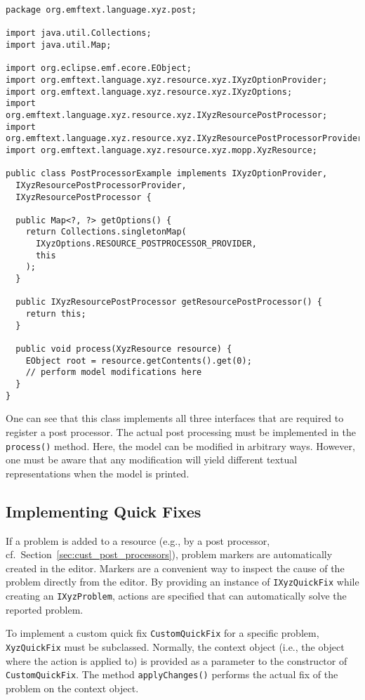 \begin{lstlisting}
package org.emftext.language.xyz.post;

import java.util.Collections;
import java.util.Map;

import org.eclipse.emf.ecore.EObject;
import org.emftext.language.xyz.resource.xyz.IXyzOptionProvider;
import org.emftext.language.xyz.resource.xyz.IXyzOptions;
import org.emftext.language.xyz.resource.xyz.IXyzResourcePostProcessor;
import org.emftext.language.xyz.resource.xyz.IXyzResourcePostProcessorProvider;
import org.emftext.language.xyz.resource.xyz.mopp.XyzResource;

public class PostProcessorExample implements IXyzOptionProvider, 
  IXyzResourcePostProcessorProvider, 
  IXyzResourcePostProcessor {

  public Map<?, ?> getOptions() {
    return Collections.singletonMap(
      IXyzOptions.RESOURCE_POSTPROCESSOR_PROVIDER, 
      this
    );
  }

  public IXyzResourcePostProcessor getResourcePostProcessor() {
    return this;
  }

  public void process(XyzResource resource) {
    EObject root = resource.getContents().get(0);
    // perform model modifications here
  }
}
\end{lstlisting}

One can see that this class implements all three interfaces that are required to
register a post processor. The actual post processing must be implemented in the
\texttt{process()} method. Here, the model can be modified in arbitrary ways.
However, one must be aware that any modification will yield different textual
representations when the model is printed.

\subsection{Implementing Quick Fixes}
\label{sec:cust_quick_fixes}

If a problem is added to a resource (e.g., by a post processor, cf.~Section~\ref{sec:cust_post_processors}), 
problem markers are automatically created in the editor. Markers are a convenient 
way to inspect the cause of the problem directly from the editor. By providing an 
instance of \texttt{IXyzQuickFix} while creating an \texttt{IXyzProblem}, actions 
are specified that can automatically solve the reported problem.

To implement a custom quick fix \texttt{CustomQuickFix} for a specific problem, 
\texttt{XyzQuickFix} must be subclassed. Normally, the context object (i.e., the 
object where the action is applied to) is provided as a parameter to the constructor 
of \texttt{CustomQuickFix}. The method \texttt{applyChanges()} performs the actual
fix of the problem on the context object.

